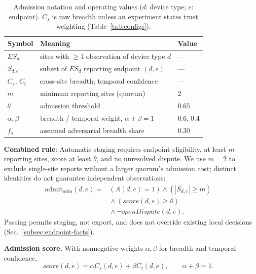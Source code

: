 \documentclass[journal]{IEEEtran}
\theoremstyle{definition}
\begin{document}
\begin{table}[t]
\centering
\caption{Admission notation and operating values ($d$: device type; $e$: endpoint). $C_s$ is raw breadth unless an experiment states trust weighting (Table~\ref{tab:configs}).}
\label{tab:symbols}
\scriptsize
\begin{tabular}{@{}p{1.3cm}p{5.00cm}p{0.75cm}@{}}
\toprule
Symbol & Meaning & Value \\
\midrule
$ES_d$ & sites with $\ge1$ observation of device type $d$ & --- \\
$S_{d,e}$ & subset of $ES_d$ reporting endpoint $(d,e)$ & --- \\
$C_s$, $C_t$ & cross-site breadth; temporal confidence & --- \\
$m$ & minimum reporting sites (quorum) & 2 \\
$\theta$ & admission threshold & 0.65 \\
$\alpha,\beta$ & breadth / temporal weight, $\alpha+\beta=1$ & 0.6, 0.4 \\
$f_s$ & assumed adversarial breadth share & 0.30 \\
\bottomrule
\end{tabular}
\end{table}

\textbf{Combined rule}: Automatic staging requires endpoint eligibility, at least $m$ reporting sites, score at least $\theta$, and no unresolved dispute. We use $m=2$ to exclude single-site reports without a larger quorum's admission cost; distinct identities do not guarantee independent observations:
\begin{equation}
\begin{aligned}
\mathrm{admit}_{auto}(d,e)
={}&(A(d,e)=1)\wedge(|S_{d,e}|\ge m)\\
 &{}\wedge(score(d,e)\ge\theta)\\
 &{}\wedge\neg openDispute(d,e).
\end{aligned}
\label{eq:admitauto}
\end{equation}
Passing permits staging, not export, and does not override existing local decisions (Sec.~\ref{subsec:endpoint-facts}).

\textbf{Admission score.} With nonnegative weights $\alpha,\beta$ for breadth and temporal confidence,
\begin{equation}
score(d,e)=\alpha C_s(d,e)+\beta C_t(d,e),
\qquad \alpha+\beta=1 .
\label{eq:score}
\end{equation}

\end{document}
